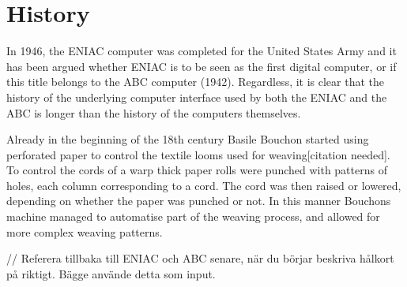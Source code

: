 \section{History}
In 1946, the ENIAC computer was completed for the United States Army and it has been argued whether ENIAC is to be seen as the first digital computer\cite{McCartney1999}, or if this title belongs to the ABC computer (1942)\cite{court}. Regardless, it is clear that the history of the underlying computer interface used by both the ENIAC and the ABC is longer than the history of the computers themselves.

Already in the beginning of the 18th century Basile Bouchon started using perforated paper to control the textile looms used for weaving[citation needed]. To control the cords of a warp thick paper rolls were punched with patterns of holes, each column corresponding to a cord. The cord was then raised or lowered, depending on whether the paper was punched or not. In this manner Bouchons machine managed to automatise part of the weaving process, and allowed for more complex weaving patterns.


// Referera tillbaka till ENIAC och ABC senare, när du börjar beskriva hålkort på riktigt. Bägge använde detta som input.





